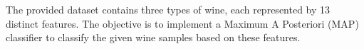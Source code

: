 The provided dataset contains three types of wine, each represented 
by 13 distinct features. The objective is to implement a Maximum A 
Posteriori (MAP) classifier to classify the given wine samples based 
on these features. 